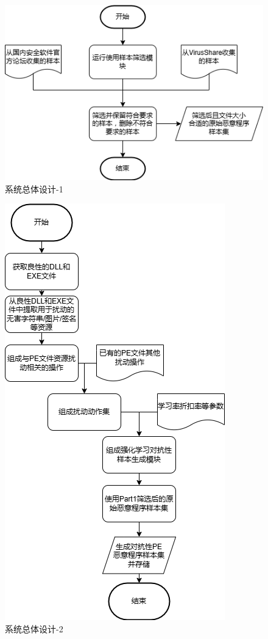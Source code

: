 \begin{figure}[htbp]
  \centering
  \includegraphics[]{images/system_design1.png}
  \caption{系统总体设计-1}\label{fig:system_design1}
\end{figure}
\begin{figure}[htbp]
  \centering
  \includegraphics[scale=0.80]{images/system_design2.png}
  \caption{系统总体设计-2}\label{fig:system_design2}
\end{figure}
